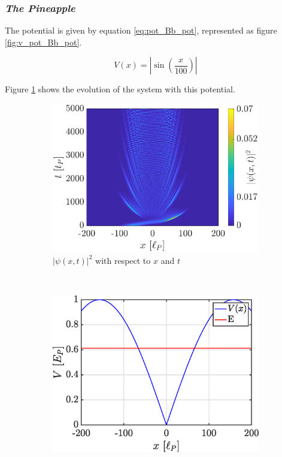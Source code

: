 \documentclass[a4paper,12pt,twoside]{article}
\newcommand{\bracket}[1]{\left(#1\right)}
\newcommand{\abs}[1]{\left|#1\right|}
\begin{document}
      \subsubsection{\textit{The Pineapple}}
        The potential is given by equation \eqref{eq:pot_Bb_pot}, represented as figure \ref{fig:v_pot_Bb_pot}.

        \begin{equation}
          V(x) = \abs{\sin\bracket{\frac{x}{100}}}
          \label{eq:pot_Bb_pot}
        \end{equation}

        Figure \ref{fig:v_pot_Bb_evo} shows the evolution of the system with this potential.


        \begin{figure}[h]
          \centering
          \begin{subfigure}[t]{0.45\textwidth}
            \includegraphics[width=\textwidth]{graphs/v_pot_Bb_evo.eps}
            \caption{$|\psi(x, t)|^2$ with respect to $x$ and $t$}
            \label{fig:v_pot_Bb_evo}
          \end{subfigure}
          ~
          \begin{subfigure}[t]{0.45\textwidth}
            \includegraphics[width=\textwidth]{graphs/v_pot_Bb_pot.eps}

\end{subfigure}
\end{figure}
\end{document}
